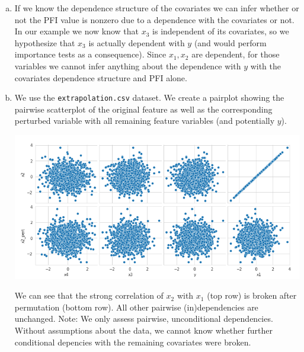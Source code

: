 {\begin{enumerate}[a)]
		\item If we know the dependence structure of the covariates we can infer whether or not the PFI value is nonzero due to a dependence with the covariates or not. In our example we now know that $x_3$ is independent of its covariates, so we hypothesize that $x_3$ is actually dependent with $y$ (and would perform importance tests as a consequence). Since $x_1, x_2$ are dependent, for those variables we cannot infer anything about the dependence with $y$ with the covariates dependence structure and PFI alone.
		
		\item We use the \texttt{extrapolation.csv} dataset. We create a pairplot showing the pairwise scatterplot of the original feature as well as the corresponding perturbed variable with all remaining feature variables (and potentially $y$).
		\begin{center}
			\includegraphics[width = .7\textwidth]{"figure/pairplot_comparison.png"}
		\end{center}
		We can see that the strong correlation of $x_2$ with $x_1$ (top row) is broken after permutation (bottom row). All other pairwise (in)dependencies are unchanged. Note: We only assess pairwise, unconditional dependencies. Without assumptions about the data, we cannot know whether further conditional depencies with the remaining covariates were broken.
		
	\end{enumerate}
}
